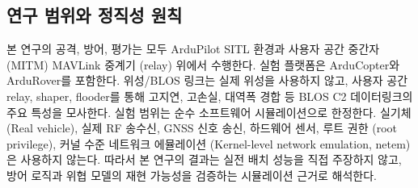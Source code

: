 \subsection{연구 범위와 정직성 원칙}



본 연구의 공격, 방어, 평가는 모두 ArduPilot SITL 환경과 사용자 공간 중간자 (MITM) MAVLink 중계기 (relay) 위에서 수행한다. 실험 플랫폼은 ArduCopter와 ArduRover를 포함한다. 위성/BLOS 링크는 실제 위성을 사용하지 않고, 사용자 공간 relay, shaper, flooder를 통해 고지연, 고손실, 대역폭 경합 등 BLOS C2 데이터링크의 주요 특성을 모사한다.
%
실험 범위는 순수 소프트웨어 시뮬레이션으로 한정한다. 실기체 (Real vehicle), 실제 RF 송수신, GNSS 신호 송신, 하드웨어 센서, 루트 권한 (root privilege), 커널 수준 네트워크 에뮬레이션 (Kernel-level network emulation, netem)은 사용하지 않는다. 따라서 본 연구의 결과는 실전 배치 성능을 직접 주장하지 않고, 방어 로직과 위협 모델의 재현 가능성을 검증하는 시뮬레이션 근거로 해석한다.
%


